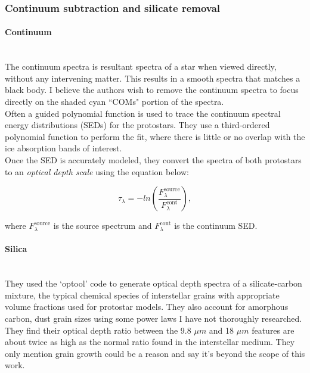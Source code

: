 \documentclass[svgnames]{article}     %
\begin{document}
\subsubsection{Continuum subtraction and silicate removal} 

\paragraph{Continuum} \mbox{} \\

The continuum spectra is resultant spectra of a star when viewed directly,
without any intervening matter. This results in a smooth spectra that matches
a black body. I believe the authors wish to remove the continuum spectra to
focus directly on the shaded cyan ``COMs" portion of the spectra. \\

Often a guided polynomial function is used to trace the continuum spectral
energy distributions (SEDs) for the protostars. They use a third-ordered
polynomial function to perform the fit, where there is little or no overlap
with the ice absorption bands of interest. \\

Once the SED is accurately modeled, they convert the spectra of both protostars
to an \textit{optical depth scale} using the equation below: 

\[
\tau_\lambda = -ln \left( \frac{F_\lambda^\text{source} }{F_\lambda^\text{cont}
} \right), 
\] \vspace{3px}

where $F_\lambda^\text{source}$ is the source spectrum and
$F_\lambda^\text{cont}$ is the continuum SED.  

\paragraph{Silica} \mbox{} \\ 

They used the `optool' code to generate optical depth
spectra of a silicate-carbon mixture, the typical chemical species of
interstellar grains with appropriate volume fractions used for protostar
models. They also account for amorphous carbon, dust grain sizes using some
power laws I have not thoroughly researched. \\

They find their optical depth ratio between the 9.8 $\mu m$ and 18  $\mu m$
features are about twice as high as the normal ratio found in the interstellar
medium. They only mention grain growth could be a reason and say it's beyond
the scope of this work. \\ 
\end{document}

